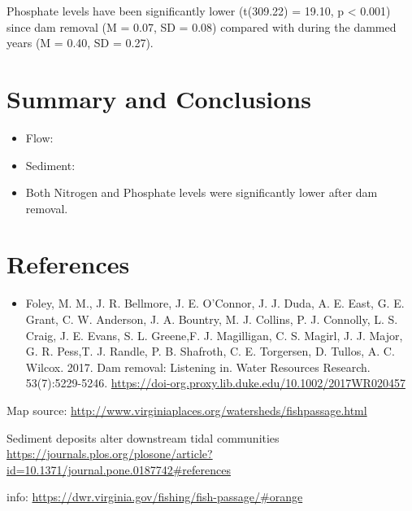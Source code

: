 \documentclass[
  12pt,
]{article}
\providecommand{\tightlist}{%
  \setlength{\itemsep}{0pt}\setlength{\parskip}{0pt}}
\begin{document}
Phosphate levels have been significantly lower (t(309.22) = 19.10, p
\textless{} 0.001) since dam removal (M = 0.07, SD = 0.08) compared with
during the dammed years (M = 0.40, SD = 0.27).

\newpage

\hypertarget{summary-and-conclusions}{%
\section{Summary and Conclusions}\label{summary-and-conclusions}}

\begin{itemize}
\item
  Flow:
\item
  Sediment:
\item
  Both Nitrogen and Phosphate levels were significantly lower after dam
  removal.
\end{itemize}

\newpage

\hypertarget{references}{%
\section{References}\label{references}}

\begin{itemize}
\tightlist
\item
  Foley, M. M., J. R. Bellmore, J. E. O'Connor, J. J. Duda, A. E. East,
  G. E. Grant, C. W. Anderson, J. A. Bountry, M. J. Collins, P. J.
  Connolly, L. S. Craig, J. E. Evans, S. L. Greene,F. J. Magilligan, C.
  S. Magirl, J. J. Major, G. R. Pess,T. J. Randle, P. B. Shafroth, C. E.
  Torgersen, D. Tullos, A. C. Wilcox. 2017. Dam removal: Listening in.
  Water Resources Research. 53(7):5229-5246.
  \url{https://doi-org.proxy.lib.duke.edu/10.1002/2017WR020457}
\end{itemize}

Map source:
\url{http://www.virginiaplaces.org/watersheds/fishpassage.html}

Sediment deposits alter downstream tidal communities
\url{https://journals.plos.org/plosone/article?id=10.1371/journal.pone.0187742\#references}

info: \url{https://dwr.virginia.gov/fishing/fish-passage/\#orange}
\end{document}
